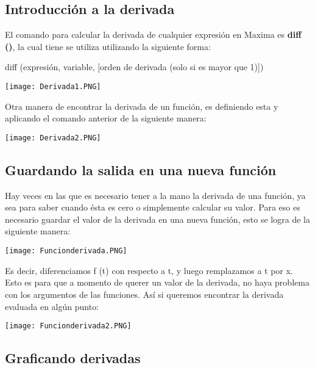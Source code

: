\documentclass{article}
\begin{document}
\subsection{Introducción a la derivada}

El comando para calcular la derivada de cualquier expresión en Maxima es \textbf{diff ()}, la cual tiene se utiliza utilizando la siguiente forma:

\centerline {diff (expresión, variable, [orden de derivada (solo si es mayor que 1)])}

\begin{center}
\texttt{[image: Derivada1.PNG]}
\end{center}

Otra manera de encontrar la derivada de un función, es definiendo esta y aplicando el comando anterior de la siguiente manera: 

\begin{center}
\texttt{[image: Derivada2.PNG]}
\end{center}

\subsection{Guardando la salida en una nueva función}

Hay veces en las que es necesario tener a la mano la derivada de una función, ya sea para saber cuando ésta es cero o simplemente calcular su valor. Para eso es necesario guardar el valor de la derivada en una nueva función, esto se logra de la siguiente manera:

\begin{center}
\texttt{[image: Funcionderivada.PNG]}
\end{center}

Es decir, diferenciamos f (t) con respecto a t, y luego remplazamos a t por x. Esto es para que a momento de querer un valor de la derivada, no haya problema con los argumentos de las funciones. Así si queremos encontrar la derivada evaluada en algún punto:

\begin{center}
\texttt{[image: Funcionderivada2.PNG]}
\end{center}

\subsection{Graficando derivadas}
\end{document}
